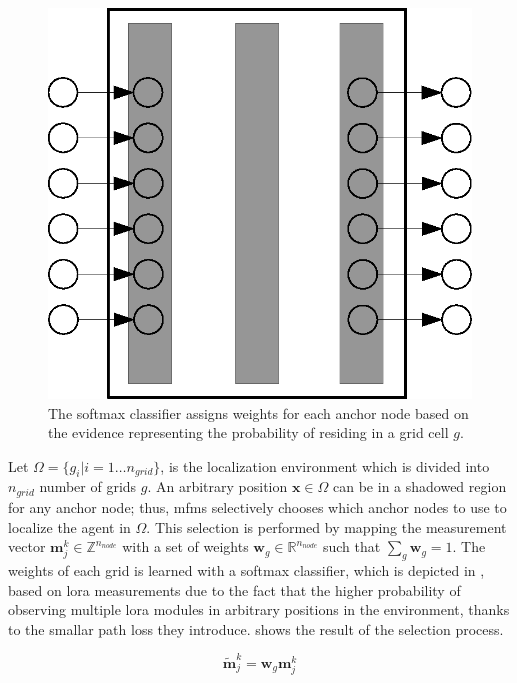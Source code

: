     \begin{figure}[thpb]
       \centering
       \includegraphics[width=\linewidth]{figures/softmax.eps}
       \caption{\label{fig:softmax}The softmax classifier assigns weights for each anchor node based on the evidence representing the probability of residing in a grid cell $g$.}
    \end{figure}

    Let $\Omega=\{g_i | i=1\ldots n_{grid}\}$, is the localization environment which is divided into $n_{grid}$ number of grids $g$.
    An arbitrary position $\bm{x} \in \Omega$ can be in a shadowed region for any anchor node; thus, \gls{mfms} selectively chooses which anchor nodes to use to localize the agent in $\Omega$.
    This selection is performed by mapping the measurement vector $\bm{m}^{k}_j \in \mathbb{Z}^{n_{node}}$ with a set of weights $\bm{w}_g \in \mathbb{R}^{n_{node}}$ such that $\sum_g \bm{w}_g = 1$.
    The weights of each grid is learned with a softmax classifier, which is depicted in , based on \gls{lora} measurements due to the fact that the higher probability of observing multiple \gls{lora} modules in arbitrary positions in the environment, thanks to the smallar path loss they introduce.
     shows the result of the selection process.

    \begin{equation}
        \label{eq:weighted_m}
        \bm{\widetilde{m}}^{k}_j = \bm{w}_g \bm{m}^{k}_j
    \end{equation}

